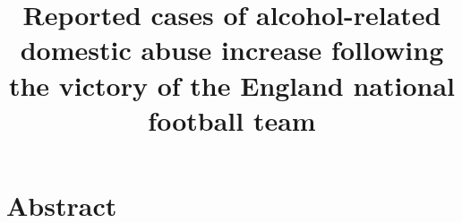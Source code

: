 \documentclass[12pt, letterpaper]{article}
\begin{document}
\title{Reported cases of alcohol-related domestic abuse increase following the victory of the England national football team}
\date{}
\maketitle


%

\section*{Abstract}


\end{document}
